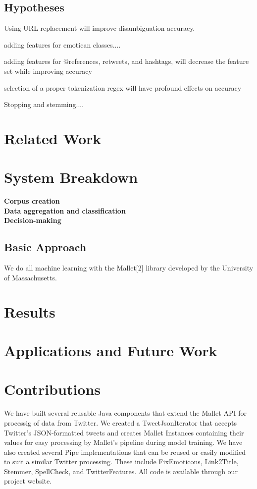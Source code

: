 \documentclass[letterpaper]{article}
\begin{document}
\subsection{Hypotheses}
\item Using URL-replacement will improve disambiguation accuracy. 
\item adding features for emotican classes....
\item adding features for @references, retweets, and hashtags, will decrease the feature set while improving accuracy
\item selection of a proper tokenization regex will have profound effects on accuracy
\item Stopping and stemming....

\section{Related Work}



\section{System Breakdown}
\textbf{Corpus creation}\\
\textbf{Data aggregation and classification}\\
\textbf{Decision-making}\\

\subsection{Basic Approach}

We do all machine learning with the Mallet[2] library developed by the University of Massachusetts. 


\section{Results}

\section{Applications and Future Work}

\section{Contributions}

We have built several reusable Java components that extend the Mallet API for processig of data from Twitter. We created a TweetJsonIterator that accepts Twitter's JSON-formatted tweets and creates Mallet Instances containing their values for easy processing by Mallet's pipeline during model training. We have also created several Pipe implementations that can be reused or easily modified to suit a similar Twitter processing. These include FixEmoticons, Link2Title, Stemmer, SpellCheck, and TwitterFeatures. All code is available through our project website.
\end{document}
